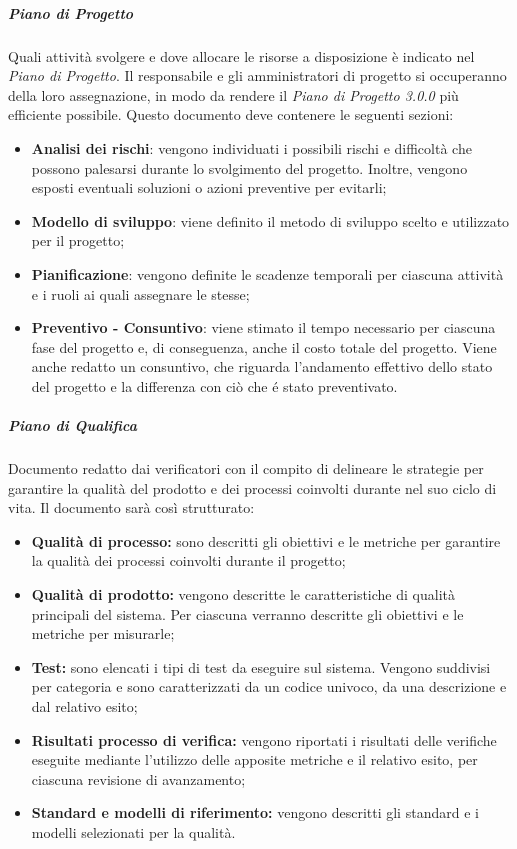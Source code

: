 \subparagraph*{Piano di Progetto\doc}
Quali attività svolgere e dove allocare le risorse a disposizione è indicato nel \textit{Piano di Progetto}\docs. Il responsabile e gli amministratori di progetto si occuperanno della loro assegnazione, in modo da rendere il \textit{Piano di Progetto 3.0.0\doc} più efficiente possibile. Questo documento deve contenere le seguenti sezioni:
\begin{itemize}
	\item \textbf{Analisi dei rischi}: vengono individuati i possibili rischi e difficoltà che possono palesarsi durante lo svolgimento del progetto. Inoltre, vengono esposti eventuali soluzioni o azioni preventive per evitarli;
	\item \textbf{Modello di sviluppo}: viene definito il metodo di sviluppo scelto e utilizzato per il progetto;
	\item \textbf{Pianificazione}: vengono definite le scadenze temporali per ciascuna attività e i ruoli ai quali assegnare le stesse;
	\item \textbf{Preventivo - Consuntivo}: viene stimato il tempo necessario per ciascuna fase del progetto e, di conseguenza, anche il costo totale del progetto. Viene anche redatto un consuntivo, che riguarda l'andamento effettivo dello stato del progetto e la differenza con ciò che é stato preventivato.
\end{itemize}
\subparagraph*{Piano di Qualifica\doc}
Documento redatto dai verificatori con il compito di delineare le strategie per garantire la qualità del prodotto e dei processi coinvolti durante nel suo ciclo di vita. Il documento sarà così strutturato:
\begin{itemize}
	\item \textbf{Qualità di processo:} sono descritti gli obiettivi e le metriche per garantire la qualità dei processi coinvolti durante il progetto;
	\item \textbf{Qualità di prodotto:} vengono descritte le caratteristiche di qualità principali del sistema. Per ciascuna verranno descritte gli obiettivi e le metriche per misurarle;
	\item \textbf{Test:} sono elencati i tipi di test da eseguire sul sistema. Vengono suddivisi per categoria e sono caratterizzati da un codice univoco, da una descrizione e dal relativo esito;
	\item \textbf{Risultati processo di verifica:} vengono riportati i risultati delle verifiche eseguite mediante l'utilizzo delle apposite metriche e il relativo esito, per ciascuna revisione di avanzamento;
	\item \textbf{Standard e modelli di riferimento:} vengono descritti gli standard e i modelli selezionati per la qualità.
\end{itemize}

